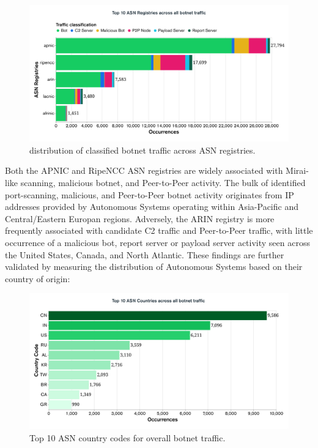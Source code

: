 \begin{figure}[!htb]
    \centering
    \includegraphics[width=0.9\linewidth]{results/top_ASN_registries.png}
    \caption{distribution of classified botnet traffic across ASN registries.}
    \label{fig:asn_registries_barchart} 
\end{figure}

Both the APNIC and RipeNCC ASN registries are widely associated with Mirai-like scanning, malicious botnet, and Peer-to-Peer activity. The bulk of identified port-scanning, malicious, and Peer-to-Peer botnet activity originates from IP addresses provided by Autonomous Systems operating within Asia-Pacific and Central/Eastern Europan regions. Adversely, the ARIN registry is more frequently associated with candidate C2 traffic and Peer-to-Peer traffic, with little occurrence of a malicious bot, report server or payload server activity seen across the United States, Canada, and North Atlantic. These findings are further validated by measuring the distribution of Autonomous Systems based on their country of origin:

\begin{figure}[!htb]
    \centering
    \includegraphics[width=0.75\linewidth]{results/top_10_asn_countries_overall.png}
    \caption{Top 10 ASN country codes for overall botnet traffic.}
    \label{fig:overall_asn_country_barchart} 
\end{figure}

